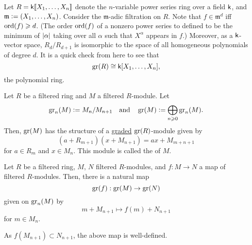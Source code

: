 \begin{ex}
	Let $R = \mathsf{k}[\![X_{1}, \ldots, X_{n}]\!]$ denote the $n$-variable power series ring over a field $\mathsf{k}$, and $\mathfrak{m} \vcentcolon= (X_{1}, \ldots, X_{n})$. Consider the $\mathfrak{m}$-adic filtration on $R$. Note that $f \in \mathfrak{m}^{d}$ iff $\operatorname{ord}(f) \geqslant d$. (The order $\operatorname{ord}(f)$ of a nonzero power series to defined to be the minimum of ${\left\lvert \alpha \right\lvert}$ taking over all $\alpha$ such that $X^{\alpha}$ appears in $f$.) \newline
	Moreover, as a $\mathsf{k}$-vector space, $R_{d}/R_{d + 1}$ is isomorphic to the space of all homogeneous polynomials of degree $d$. It is a quick check from here to see that
	\begin{equation*} 
		\operatorname{gr}(R) \cong \mathsf{k}[X_{1}, \ldots, X_{n}],
	\end{equation*}
	the polynomial ring.
\end{ex}

\begin{defn} \label{defn:associated-graded-module}
	Let $R$ be a filtered ring and $M$ a filtered $R$-module. Let
	\begin{equation*} 
		\operatorname{gr}_{n}(M) \vcentcolon= M_{n}/M_{n + 1} \quad\text{and}\quad \operatorname{gr}(M) \vcentcolon= \bigoplus_{n \geqslant 0} \operatorname{gr}_{n}(M).
	\end{equation*}
	Then, $\operatorname{gr}(M)$ has the structure of a \underline{graded} $\operatorname{gr}(R)$-module given by
	\begin{equation*} 
		(a + R_{m + 1})(x + M_{n + 1}) = ax + M_{m + n + 1}
	\end{equation*}
	for $a \in R_{m}$ and $x \in M_{n}$. This module is called the  of $M$.
\end{defn}

\begin{defn} \label{defn:gr-on-maps}
	Let $R$ be a filtered ring, $M$, $N$ filtered $R$-modules, and $f : M \to N$ a map of filtered $R$-modules. Then, there is a natural map
	\begin{equation*} 
		\operatorname{gr}(f) : \operatorname{gr}(M) \to \operatorname{gr}(N)
	\end{equation*}
	given on $\operatorname{gr}_{n}(M)$ by
	\begin{equation*} 
		m + M_{n + 1} \mapsto f(m) + N_{n + 1}
	\end{equation*}
	for $m \in M_{n}$.
\end{defn}

\begin{rem}
	As $f(M_{n + 1}) \subset N_{n + 1}$, the above map is well-defined.
\end{rem}

